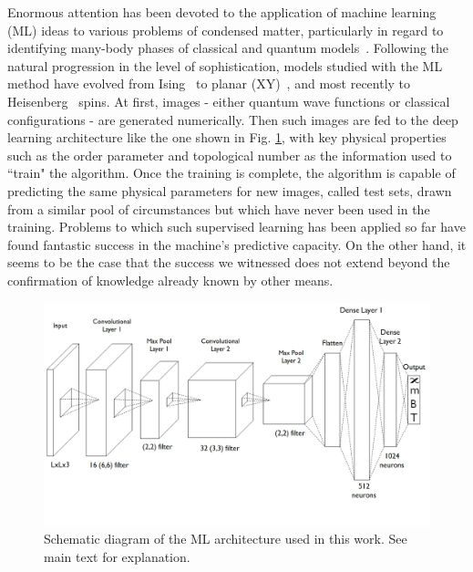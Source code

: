 \documentclass[reprint,amsmath,amssymb,aps,showpacs,superscriptaddress,prb]{revtex4-1}
\begin{document}
Enormous attention has been devoted to the application of machine learning (ML) ideas to various problems of condensed matter, particularly in regard to identifying many-body phases of classical and quantum models~\cite{melko16,wang16,melko17,melko17b,melko17c,tanaka17,scalettar17,wetzel17,wetzel17b,iso18,kim18,zhai17,scalettar17,beach18,zhai18,russian18}.
Following the natural progression in the level of sophistication, models studied with the ML method have evolved from Ising~\cite{melko16,wang16,melko17,melko17b,melko17c,tanaka17,scalettar17,wetzel17,wetzel17b,iso18,kim18} to planar (XY)~\cite{zhai17,scalettar17,wetzel17b,beach18,zhai18}, and most recently to Heisenberg~\cite{russian18} spins. At first, images - either quantum wave functions or classical configurations - are generated numerically. Then such images are fed to the deep learning architecture like the one shown in Fig. \ref{fig:1}, with key physical properties such as the order parameter and topological number as the information used to ``train" the algorithm. Once the training is complete, the algorithm is capable of predicting the same physical parameters for new images, called test sets, drawn from a similar pool of circumstances but which have never been used in the training. Problems to which such supervised learning has been applied so far have found fantastic success in the machine's predictive capacity. On the other hand, it seems to be the case that the success we witnessed does not extend beyond the confirmation of knowledge already known by other means.
%
\begin{figure}[ht]
\includegraphics[scale=0.35]{fig1.png}
\caption{Schematic diagram of the ML architecture used in this work. See main text for explanation.}\label{fig:1}
\end{figure}
\end{document}
